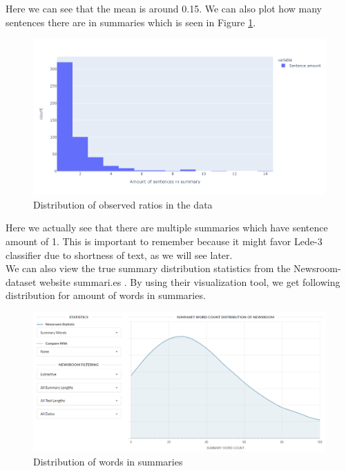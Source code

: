 \documentclass{article}
\begin{document}
\noindent
Here we can see that the mean is around 0.15. We can also plot how many sentences there are in summaries which is seen in Figure \ref{fig:empirical_lengths}.

\noindent
\begin{figure}[H]
	\centering
	\includegraphics[scale=0.4]{empirical_lengths.png}
	\caption{Distribution of observed ratios in the data}
	\label{fig:empirical_lengths}
\end{figure}

\noindent
Here we actually see that there are multiple summaries which have sentence amount of 1. This is important to remember because it might favor Lede-3 classifier due to shortness of text, as we will see later.\\

\noindent
We can also view the true summary distribution statistics from the Newsroom-dataset website summari.es \cite{dataset}. By using their visualization tool, we get following distribution for amount of words in summaries. \\

\noindent
\begin{figure}[H]
	\centering
	\includegraphics[scale=0.4]{words_in_summary.png}
	\caption{Distribution of words in summaries}
	\label{fig:words_in_summary}
\end{figure}
\end{document}
